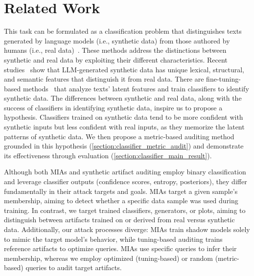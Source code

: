 \section{Related Work}
\label{section:related_work}

This task can be formulated as a classification problem that distinguishes texts generated by language models (i.e., synthetic data) from those authored by humans (i.e., real data)~\cite{NTNYE17, GSR19, FZ21, GZWJNDYW23, MLKMF23, LYLL23, WMISSTAMPAAHGN24, BWBVN24}.
These methods address the distinctions between synthetic and real data by exploiting their different characteristics.
Recent studies~\cite{LYLL23,HSCBZ24} show that LLM-generated synthetic data has unique lexical, structural, and semantic features that distinguish it from real data.
There are fine-tuning-based methods~\cite{CKZLSR23, LYLL23, WMISSTAMPAAHGN24, BWBVN24} that analyze texts' latent features and train classifiers to identify synthetic data.
The differences between synthetic and real data, along with the success of classifiers in identifying synthetic data, inspire us to propose a hypothesis.
Classifiers trained on synthetic data tend to be more confident with synthetic inputs but less confident with real inputs, as they memorize the latent patterns of synthetic data.
We then propose a metric-based auditing method grounded in this hypothesis (\autoref{section:classifier_metric_audit}) and demonstrate its effectiveness through evaluation (\autoref{section:classifier_main_result}).

Although both MIAs and synthetic artifact auditing employ binary classification and leverage classifier outputs (confidence scores, entropy, posteriors), they differ fundamentally in their attack targets and goals.
MIAs target a given sample's membership, aiming to detect whether a specific data sample was used during training.
In contrast, we target trained classifiers, generators, or plots, aiming to distinguish between artifacts trained on or derived from real versus synthetic data.
Additionally, our attack processes diverge: MIAs train shadow models solely to mimic the target model's behavior, while tuning-based auditing trains reference artifacts to optimize queries.
MIAs use specific queries to infer their membership, whereas we employ optimized (tuning-based) or random (metric-based) queries to audit target artifacts.

